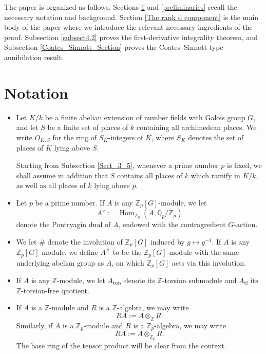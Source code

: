 \documentclass[a4paper,11pt]{article}
\begin{document}
\medskip

\noindent The paper is organized as follows. Sections \ref{Notations} and \ref{preliminaries}
recall the necessary notation and background. Section \ref{The rank d component} is the main body of the paper where we introduce the relevant necessary ingredients of the proof. Subsection \ref{subsect4.2}
proves the first-derivative integrality theorem, and Subsection
\ref{Coates_Sinnott_Section} proves the Coates--Sinnott-type annihilation
result.










\section{Notation}\label{Notations}

\begin{itemize}
\item Let \(K/k\) be a finite abelian extension of number fields with Galois
group \(G\), and let \(S\) be a finite set of places of \(k\) containing all
archimedean places. We write \(O_{K,S}\) for the ring of \(S_K\)-integers of
\(K\), where \(S_K\) denotes the set of places of \(K\) lying above \(S\).

Starting from Subsection \ref{Sect_3_5}, whenever a prime number \(p\) is fixed,
we shall assume in addition that \(S\) contains all places of \(k\) which ramify
in \(K/k\), as well as all places of \(k\) lying above \(p\).

\item Let \(p\) be a prime number. If \(A\) is any \(\mathbb Z_p[G]\)-module, we
let
\[
A^\vee:=\operatorname{Hom}_{\mathbb Z_p}(A,\mathbb Q_p/\mathbb Z_p)
\]
denote the Pontryagin dual of \(A\), endowed with the contragredient
\(G\)-action.

\item We let \(\#\) denote the involution of \(\mathbb Z_p[G]\) induced by
\(g\mapsto g^{-1}\). If \(A\) is any \(\mathbb Z_p[G]\)-module, we define
\(A^\#\) to be the \(\mathbb Z_p[G]\)-module with the same underlying abelian
group as \(A\), on which \(\mathbb Z_p[G]\) acts via this involution.

\item If \(A\) is any \(\mathbb Z\)-module, we let \(A_{\mathrm{tors}}\) denote
its \(\mathbb Z\)-torsion submodule and \(A_{\mathrm{tf}}\) its
\(\mathbb Z\)-torsion-free quotient.

\item If \(A\) is a \(\mathbb Z\)-module and \(R\) is a \(\mathbb Z\)-algebra,
we may write
\[
RA:=A\otimes_{\mathbb Z}R.
\]
Similarly, if \(A\) is a \(\mathbb Z_p\)-module and \(R\) is a
\(\mathbb Z_p\)-algebra, we may write
\[
RA:=A\otimes_{\mathbb Z_p}R.
\]
The base ring of the tensor product will be clear from the context.
\end{itemize}
\end{document}
